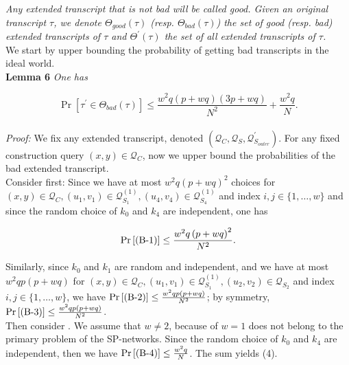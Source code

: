 \noindent \emph{Any extended transcript that is not bad will be called good. Given an original transcript $\tau$, we denote $\Theta_{good}(\tau)$ (resp. $\Theta_{bad}(\tau)$) the set of good (resp. bad) extended transcripts of $\tau$ and $\Theta^{'}(\tau)$ the set of all extended transcripts of $\tau$.}\\

We start by upper bounding the probability of getting bad transcripts in the ideal world.\\

\noindent \textbf{Lemma 6} \emph{One has}

\begin{equation}
\operatorname{Pr}[\tau^{\prime} \in \Theta_{bad}(\tau)] \leq \frac{w^2 q (p+w q) (3 p +w q)}{N^{2}} + \frac{w^{2} q}{N}.
\end{equation}
\\
\noindent \emph{Proof:} We fix any extended transcript, denoted $\left(\mathcal{Q}_{C}, \mathcal{Q}_{S}, \mathcal{Q}_{S_{outer}}^{\prime}\right)$. For any fixed construction query $(x, y) \in \mathcal{Q}_{C}$, now we upper bound the probabilities of the bad extended transcript.\\

\noindent Consider \bone first: Since we have at most $w^{2} q \left(p+w q\right)^{2}$ choices for $(x, y) \in \mathcal{Q}_{C}, \left(u_{1}, v_{1}\right) \in \mathcal{Q}_{S_{1}}^{(1)}, \left(u_{4}, v_{4}\right) \in \mathcal{Q}_{S_{4}}^{(1)}$ and index $i, j \in \{1, \ldots, w\}$ and since the random choice of $k_{0}$ and $k_{4}$ are independent, one has

$$
\operatorname{Pr}\left[\text{(B-1)}\right] \leq \frac{w^{2} q \left(p+w q\right)^{2}}{N^{2}}.
$$

Similarly, since $k_{0}$ and $k_{1}$ are random and independent, and we have at most $w^{2} q p \left(p+w q\right)$ for $(x, y) \in \mathcal{Q}_{C}, \left(u_{1}, v_{1}\right) \in \mathcal{Q}_{S_{1}}^{(1)}, \left(u_{2}, v_{2}\right) \in \mathcal{Q}_{S_{2}}$ and index $i, j \in \{1, \ldots, w\}$, we have $\operatorname{Pr}\left[\text{(B-2)}\right] \leq \frac{w^{2} q p \left(p+w q\right)}{N^{2}}$; by symmetry, $\operatorname{Pr}\left[\text{(B-3)}\right] \leq \frac{w^{2} q p \left(p+w q\right)}{N^{2}}$. \\

\noindent Then consider \bfour. We assume that $w \neq 2$, because of $w = 1$ does not belong to the primary problem of the SP-networks. Since the random choice of $k_{0}$ and $k_{4}$ are independent, then we have $\operatorname{Pr}\left[\text{(B-4)}\right] \leq \frac{w^{2} q}{N}$. The sum yields (4).

